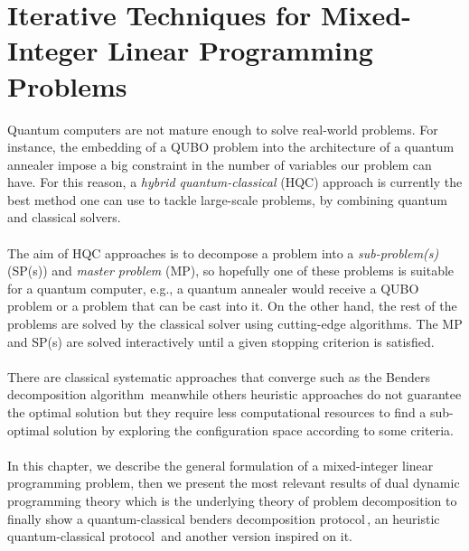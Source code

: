 
\chapter{Iterative Techniques for Mixed-Integer Linear Programming Problems } %

\label{Chapter3} %

Quantum computers are not mature enough to solve real-world problems. For instance, the embedding of a QUBO problem into the architecture of a quantum annealer impose a big constraint in the number of variables our problem can have. For this reason, a \textit{hybrid quantum-classical} (HQC) approach is currently the best method one can use to tackle large-scale problems, by combining quantum and classical solvers.\\\\
The aim of HQC approaches is to decompose a problem into a \textit{sub-problem(s)} (SP(s)) and \textit{master problem} (MP), so hopefully one of these problems is suitable for a quantum computer, e.g., a quantum annealer would receive a QUBO problem or a problem that can be cast into it. On the other hand, the rest of the problems are solved by the classical solver using cutting-edge algorithms. The MP and SP(s) are solved interactively until a given stopping criterion is satisfied. \\\\
There are classical systematic approaches that converge such as the Benders decomposition algorithm\,\cite{Sahinidis1991BDConvergence} meanwhile others heuristic approaches do not guarantee the optimal solution but they require less computational resources to find a sub-optimal solution by exploring the configuration space according to some criteria.\\\\
In this chapter, we describe the general formulation of a mixed-integer linear programming problem, then we present the most relevant results of dual dynamic programming theory which is the underlying theory of problem decomposition to finally show a quantum-classical benders decomposition protocol\,\cite{Zhao2021HybridProgramming}, an heuristic quantum-classical protocol\,\cite{Ding2019ImplementationDesign} and another version inspired on it.
